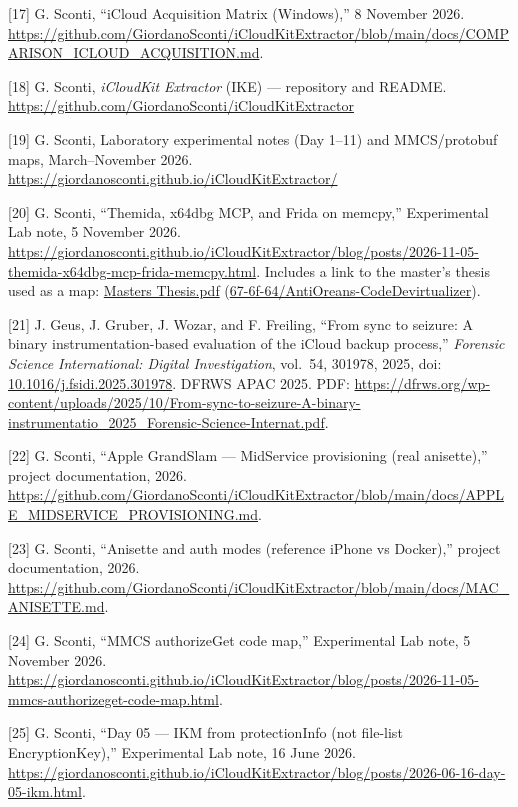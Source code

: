 \documentclass[
  english,
  10pt]{article}
\begin{document}
{[}17{]} G. Sconti, ``iCloud Acquisition Matrix (Windows),'' 8 November
2026.
\url{https://github.com/GiordanoSconti/iCloudKitExtractor/blob/main/docs/COMPARISON_ICLOUD_ACQUISITION.md}.

{[}18{]} G. Sconti, \emph{iCloudKit Extractor} (IKE) --- repository and
README. \url{https://github.com/GiordanoSconti/iCloudKitExtractor}

{[}19{]} G. Sconti, Laboratory experimental notes (Day 1--11) and
MMCS/protobuf maps, March--November 2026.
\url{https://giordanosconti.github.io/iCloudKitExtractor/}

{[}20{]} G. Sconti, ``Themida, x64dbg MCP, and Frida on memcpy,''
Experimental Lab note, 5 November 2026.
\url{https://giordanosconti.github.io/iCloudKitExtractor/blog/posts/2026-11-05-themida-x64dbg-mcp-frida-memcpy.html}.
Includes a link to the master's thesis used as a map:
\href{https://github.com/67-6f-64/AntiOreans-CodeDevirtualizer/blob/main/Masters\%20Thesis.pdf}{Masters
Thesis.pdf}
(\href{https://github.com/67-6f-64/AntiOreans-CodeDevirtualizer}{67-6f-64/AntiOreans-CodeDevirtualizer}).

{[}21{]} J. Geus, J. Gruber, J. Wozar, and F. Freiling, ``From sync to
seizure: A binary instrumentation-based evaluation of the iCloud backup
process,'' \emph{Forensic Science International: Digital Investigation},
vol.~54, 301978, 2025, doi:
\href{https://doi.org/10.1016/j.fsidi.2025.301978}{10.1016/j.fsidi.2025.301978}.
DFRWS APAC 2025. PDF:
\url{https://dfrws.org/wp-content/uploads/2025/10/From-sync-to-seizure-A-binary-instrumentatio_2025_Forensic-Science-Internat.pdf}.

{[}22{]} G. Sconti, ``Apple GrandSlam --- MidService provisioning (real
anisette),'' project documentation, 2026.
\url{https://github.com/GiordanoSconti/iCloudKitExtractor/blob/main/docs/APPLE_MIDSERVICE_PROVISIONING.md}.

{[}23{]} G. Sconti, ``Anisette and auth modes (reference iPhone vs
Docker),'' project documentation, 2026.
\url{https://github.com/GiordanoSconti/iCloudKitExtractor/blob/main/docs/MAC_ANISETTE.md}.

{[}24{]} G. Sconti, ``MMCS authorizeGet code map,'' Experimental Lab
note, 5 November 2026.
\url{https://giordanosconti.github.io/iCloudKitExtractor/blog/posts/2026-11-05-mmcs-authorizeget-code-map.html}.

{[}25{]} G. Sconti, ``Day 05 --- IKM from protectionInfo (not file-list
EncryptionKey),'' Experimental Lab note, 16 June 2026.
\url{https://giordanosconti.github.io/iCloudKitExtractor/blog/posts/2026-06-16-day-05-ikm.html}.
\end{document}

